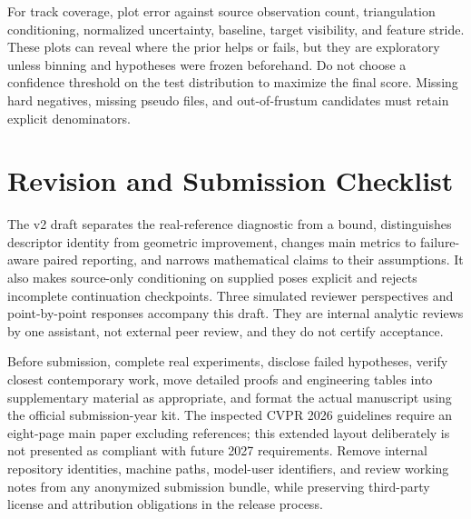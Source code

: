 \documentclass[10pt,twocolumn,letterpaper]{article}
\begin{document}
For track coverage, plot error against source observation count, triangulation conditioning, normalized uncertainty, baseline, target visibility, and feature stride. These plots can reveal where the prior helps or fails, but they are exploratory unless binning and hypotheses were frozen beforehand. Do not choose a confidence threshold on the test distribution to maximize the final score. Missing hard negatives, missing pseudo files, and out-of-frustum candidates must retain explicit denominators.

\section{Revision and Submission Checklist}
The v2 draft separates the real-reference diagnostic from a bound, distinguishes descriptor identity from geometric improvement, changes main metrics to failure-aware paired reporting, and narrows mathematical claims to their assumptions. It also makes source-only conditioning on supplied poses explicit and rejects incomplete continuation checkpoints. Three simulated reviewer perspectives and point-by-point responses accompany this draft. They are internal analytic reviews by one assistant, not external peer review, and they do not certify acceptance.

Before submission, complete real experiments, disclose failed hypotheses, verify closest contemporary work, move detailed proofs and engineering tables into supplementary material as appropriate, and format the actual manuscript using the official submission-year kit. The inspected CVPR 2026 guidelines require an eight-page main paper excluding references; this extended layout deliberately is not presented as compliant with future 2027 requirements. Remove internal repository identities, machine paths, model-user identifiers, and review working notes from any anonymized submission bundle, while preserving third-party license and attribution obligations in the release process.



\end{document}

